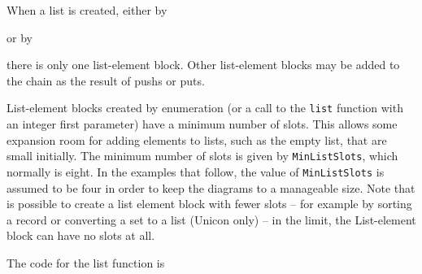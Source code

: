 When a list is created, either by


\noindent or by

\iconline{
\>[x1 ,x2, ..., xn]
}

\noindent there is only one list-element block. Other list-element
blocks may be added to the chain as the result of pushs or puts.

List-element blocks created by enumeration (or a call to the \texttt{list}
function with an integer first parameter) have a minimum number of slots.
This allows some
expansion room for adding elements to lists, such as the empty list, that
are small initially. The minimum number of slots is given by
\texttt{MinListSlots}, which normally is eight. In the examples that
follow, the value of \texttt{MinListSlots} is assumed to be four in order
to keep the diagrams to a manageable size.
Note that is possible to create a list element block with fewer slots --
for example by sorting a record {\color{blue}or converting a set to a list
(Unicon only)} -- in the limit, the List-element block can have no slots
at all.

The code for the list function is

